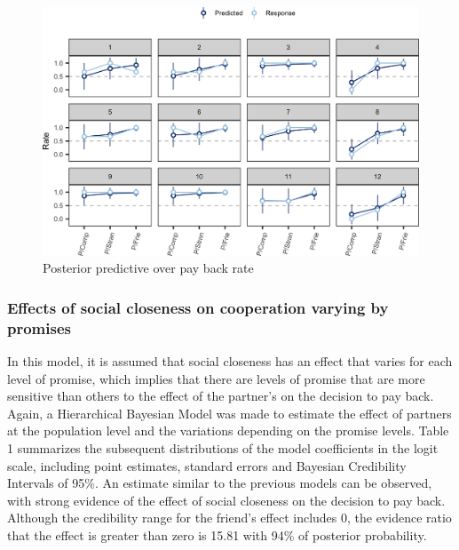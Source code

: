 \documentclass[12pt,]{article}
\begin{document}
\begin{figure}

{\centering \includegraphics[width=1\linewidth,height=1\textheight]{article_english_files/figure-latex/fig5-1} 

}

\caption{Posterior predictive over pay back rate}\label{fig:fig5}
\end{figure}

\hypertarget{effects-of-social-closeness-on-cooperation-varying-by-promises}{%
\subsubsection{Effects of social closeness on cooperation varying by
promises}\label{effects-of-social-closeness-on-cooperation-varying-by-promises}}

In this model, it is assumed that social closeness has an effect that
varies for each level of promise, which implies that there are levels of
promise that are more sensitive than others to the effect of the
partner's on the decision to pay back. Again, a Hierarchical Bayesian
Model was made to estimate the effect of partners at the population
level and the variations depending on the promise levels. Table 1
summarizes the subsequent distributions of the model coefficients in the
logit scale, including point estimates, standard errors and Bayesian
Credibility Intervals of 95\%. An estimate similar to the previous
models can be observed, with strong evidence of the effect of social
closeness on the decision to pay back. Although the credibility range
for the friend's effect includes 0, the evidence ratio that the effect
is greater than zero is 15.81 with 94\% of posterior probability.
\end{document}

